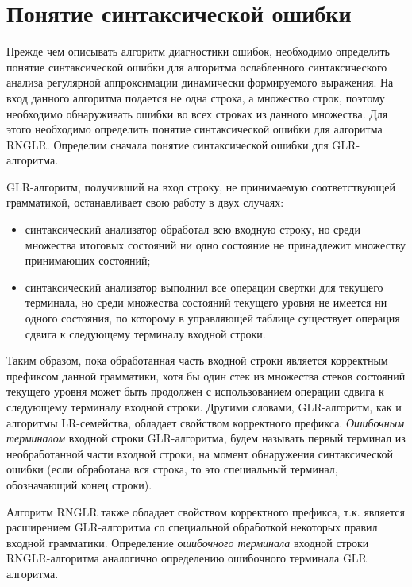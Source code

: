 
\section{Понятие синтаксической ошибки}
Прежде чем описывать алгоритм диагностики ошибок, необходимо определить понятие синтаксической ошибки для алгоритма ослабленного синтаксического анализа регулярной аппроксимации динамически формируемого выражения. На вход данного алгоритма подается не одна строка, а множество строк, поэтому необходимо обнаруживать ошибки во всех строках из данного множества. Для этого необходимо определить понятие синтаксической ошибки для алгоритма RNGLR. Определим сначала понятие синтаксической ошибки для GLR-алгоритма.

GLR-алгоритм, получивший на вход строку, не принимаемую соответствующей грамматикой, останавливает свою работу в двух случаях:
\begin{itemize}
    \item синтаксический анализатор обработал всю входную строку, но среди множества итоговых состояний ни одно состояние не принадлежит множеству принимающих состояний;
    \item синтаксический анализатор выполнил все операции свертки для текущего терминала, но среди множества состояний текущего уровня не имеется ни одного состояния, по которому в управляющей таблице существует операция сдвига к следующему терминалу входной строки.
\end{itemize}

Таким образом, пока обработанная часть входной строки является корректным префиксом данной грамматики, хотя бы один стек из множества стеков состояний текущего уровня может быть продолжен с использованием операции сдвига к следующему терминалу входной строки. Другими словами, GLR-алгоритм, как и алгоритмы LR-семейства, обладает свойством корректного префикса. \emph{Ошибочным терминалом} входной строки GLR-алгоритма, будем называть первый терминал из необработанной части входной строки, на момент обнаружения синтаксической ошибки (если обработана вся строка, то это специальный терминал, обозначающий конец строки).

Алгоритм RNGLR также обладает свойством корректного префикса, т.к. является расширением GLR-алгоритма со специальной обработкой некоторых правил входной грамматики. Определение \emph{ошибочного терминала} входной строки RNGLR-алгоритма аналогично определению ошибочного терминала GLR алгоритма.

